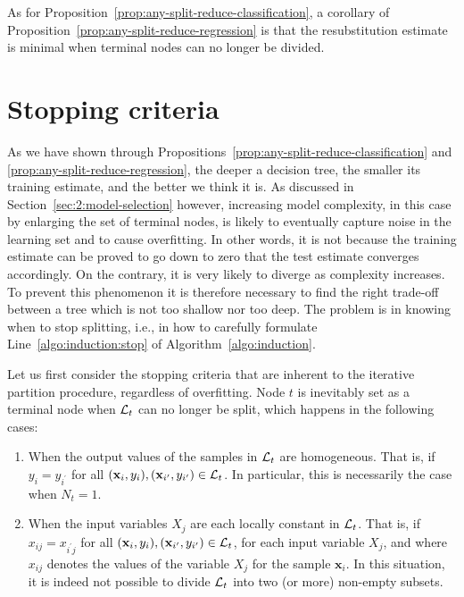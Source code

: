 As for Proposition~\ref{prop:any-split-reduce-classification}, a corollary of Proposition~\ref{prop:any-split-reduce-regression}
is that the resubstitution estimate is minimal when terminal nodes can no longer be divided.

\section{Stopping criteria}
\label{sec:3:stop}

As we have shown through Propositions~\ref{prop:any-split-reduce-classification}
and \ref{prop:any-split-reduce-regression}, the deeper a
decision tree, the smaller its training estimate, and the better we think it
is. As discussed in Section~\ref{sec:2:model-selection} however, increasing
model complexity, in this case by enlarging  the set of terminal
nodes, is likely to eventually capture noise in the learning set and to cause
overfitting. In other words, it is not because the training estimate can be
proved to go down to zero that the test estimate converges accordingly. On the
contrary, it is very likely to diverge as complexity increases. To prevent this
phenomenon it is therefore necessary to find the right trade-off between a tree
which is not too shallow nor too deep. The problem is in knowing when to stop
splitting, i.e., in how to carefully formulate Line~\ref{algo:induction:stop} of
Algorithm~\ref{algo:induction}.

Let us first consider the stopping criteria that are inherent to the iterative
partition procedure, regardless of overfitting. Node $t$ is inevitably
set as a terminal node when ${\cal L}_t$ can no longer be split, which happens in the
following cases:

\begin{enumerate}

\item When the output values of the samples in ${\cal L}_t$ are homogeneous.
That is, if $y_i = y_{i^\prime}$ for all $(\mathbf{x}_i, y_i),
(\mathbf{x}_{i^\prime}, y_{i^\prime}) \in {\cal L}_t$. In particular, this is
necessarily the case when $N_t = 1$.

\item When the input variables $X_j$ are each locally constant in ${\cal L}_t$.
That is, if $x_{ij} = x_{i^\prime j}$ for all $(\mathbf{x}_i, y_i),
(\mathbf{x}_{i^\prime}, y_{i^\prime}) \in {\cal L}_t$, for each input variable
$X_j$, and where $x_{ij}$ denotes the values of the variable $X_j$ for the
sample $\mathbf{x}_i$. In this situation, it is indeed not possible
to divide ${\cal L}_t$ into two (or more) non-empty subsets.

\end{enumerate}


